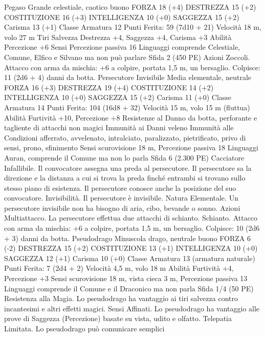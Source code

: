 \begin{multicols}{2}
Pegaso
Grande celestiale, caotico buono
FORZA 18 (+4)
DESTREZZA 15 (+2)
COSTITUZIONE 16 (+3)
INTELLIGENZA 10 (+0)
SAGGEZZA 15 (+2)
Carisma 13 (+1)
Classe Armatura 12
\hspace*{0pt}\hfill{Punti Ferita}: 59 (7d10 + 21)
Velocità 18 m, volo 27 m
Tiri Salvezza Destrezza +4, Saggezza +4, Carisma +3
Abilità Percezione +6
Sensi Percezione passiva 16
Linguaggi comprende Celestiale, Comune, Elfico e Silvano ma
non può parlare
Sfida 2 (450 PE)
Azioni
Zoccoli. Attacco con arma da mischia: +6 a colpire, portata 1,5
m, un bersaglio.
Colpisce: 11 (2d6 + 4) danni da botta.
Persecutore Invisibile
Media elementale, neutrale
FORZA 16 (+3)
DESTREZZA 19 (+4)
COSTITUZIONE 14 (+2)
INTELLIGENZA 10 (+0)
SAGGEZZA 15 (+2)
Carisma 11 (+0)
Classe Armatura 14
\hspace*{0pt}\hfill{Punti Ferita}: 104 (16d8 + 32)
Velocità 15 m, volo 15 m (fluttua)
Abilità Furtività +10, Percezione +8
Resistenze al Danno da botta, perforante e tagliente di
attacchi non magici
Immunità ai Danni veleno
Immunità alle Condizioni afferrato, avvelenato, intralciato,
paralizzato, pietrificato, privo di sensi, prono, sfinimento
Sensi scurovisione 18 m, Percezione passiva 18
Linguaggi Auran, comprende il Comune ma non lo parla
Sfida 6 (2.300 PE)
Cacciatore Infallibile. Il convocatore assegna una preda al
persecutore. Il persecutore sa la direzione e la distanza a cui si
trova la preda finché entrambi si trovano sullo stesso piano di
esistenza. Il persecutore conosce anche la posizione del suo
convocatore.
Invisibilità. Il persecutore è invisibile.
Natura Elementale. Un persecutore invisibile non ha bisogno di
aria, cibo, bevande o sonno.
Azioni
Multiattacco. La persecutore effettua due attacchi di schianto.
Schianto. Attacco con arma da mischia: +6 a colpire, portata 1,5
m, un bersaglio.
Colpisce: 10 (2d6 + 3) danni da botta.
Pseudodrago
Minuscola drago, neutrale buono
FORZA 6 (-2)
DESTREZZA 15 (+2)
COSTITUZIONE 13 (+1)
INTELLIGENZA 10 (+0)
SAGGEZZA 12 (+1)
Carisma 10 (+0)
Classe Armatura 13 (armatura naturale)
\hspace*{0pt}\hfill{Punti Ferita}: 7 (2d4 + 2)
Velocità 4,5 m, volo 18 m
Abilità Furtività +4, Percezione +3
Sensi scurovisione 18 m, vista cieca 3 m, Percezione passiva 13
Linguaggi comprende il Comune e il Draconico ma non parla
Sfida 1/4 (50 PE)
Resistenza alla Magia. Lo pseudodrago ha vantaggio ai tiri
salvezza contro incantesimi e altri effetti magici.
Sensi Affinati. Lo pseudodrago ha vantaggio alle prove di
Saggezza (Percezione) basate su vista, udito e olfatto.
Telepatia Limitata. Lo pseudodrago può comunicare semplici

\end{multicols}
